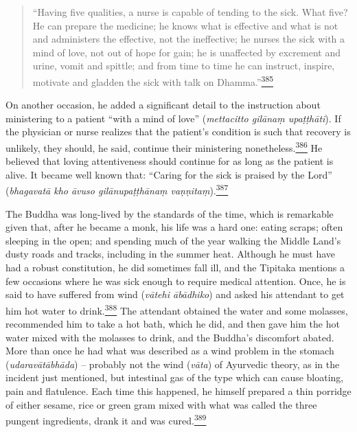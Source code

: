 \begin{quote}
``Having five qualities, a nurse is capable of tending to the sick. What
five? He can prepare the medicine; he knows what is effective and what
is not and administers the effective, not the ineffective; he nurses the
sick with a mind of love, not out of hope for gain; he is unaffected by
excrement and urine, vomit and spittle; and from time to time he can
instruct, inspire, motivate and gladden the sick with talk on
Dhamma.''\label{footprints_split_011.html_fnref385}\hyperref[footprints_split_024.htmlux5cux23fn385]{\textsuperscript{385}}
\end{quote}

On another occasion, he added a significant detail to the instruction
about ministering to a patient ``with a mind of love'' (\emph{mettacitto
gilānaṃ upaṭṭhāti}). If the physician or nurse realizes that the
patient's condition is such that recovery is unlikely, they should, he
said, continue their ministering
nonetheless.\label{footprints_split_011.html_fnref386}\hyperref[footprints_split_024.htmlux5cux23fn386]{\textsuperscript{386}}
He believed that loving attentiveness should continue for as long as the
patient is alive. It became well known that: ``Caring for the sick is
praised by the Lord'' (\emph{bhagavatā kho āvuso gilānupaṭṭhānaṃ
vaṇṇitaṃ}).\label{footprints_split_011.html_fnref387}\hyperref[footprints_split_024.htmlux5cux23fn387]{\textsuperscript{387}}

The Buddha was long-lived by the standards of the time, which is
remarkable given that, after he became a monk, his life was a hard one:
eating scraps; often sleeping in the open; and spending much of the year
walking the Middle Land's dusty roads and tracks, including in the
summer heat. Although he must have had a robust constitution, he did
sometimes fall ill, and the Tipitaka mentions a few occasions where he
was sick enough to require medical attention. Once, he is said to have
suffered from wind (\emph{vātehi ābādhiko}) and asked his attendant to
get him hot water to
drink.\label{footprints_split_011.html_fnref388}\hyperref[footprints_split_024.htmlux5cux23fn388]{\textsuperscript{388}}
The attendant obtained the water and some molasses, recommended him to
take a hot bath, which he did, and then gave him the hot water mixed
with the molasses to drink, and the Buddha's discomfort abated. More
than once he had what was described as a wind problem in the stomach
(\emph{udaravātābhāda}) -- probably not the wind (\emph{vāta}) of
Ayurvedic theory, as in the incident just mentioned, but intestinal gas
of the type which can cause bloating, pain and flatulence. Each time
this happened, he himself prepared a thin porridge of either sesame,
rice or green gram mixed with what was called the three pungent
ingredients, drank it and was
cured.\label{footprints_split_011.html_fnref389}\hyperref[footprints_split_024.htmlux5cux23fn389]{\textsuperscript{389}}

